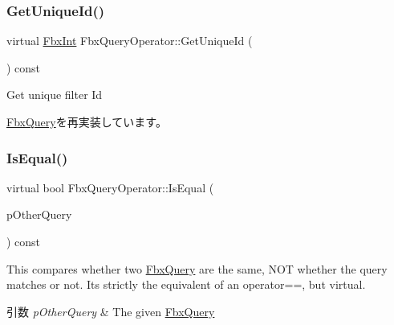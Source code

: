 \mbox{\label{class_fbx_query_operator_a55d021e0103b5e7dc0f8a80e4b468314}} 
\subsubsection{\texorpdfstring{Get\+Unique\+Id()}{GetUniqueId()}}
{\footnotesize\ttfamily virtual \hyperlink{fbxtypes_8h_a088fa96de3b0b3ea69f0f6afef525dfb}{Fbx\+Int} Fbx\+Query\+Operator\+::\+Get\+Unique\+Id (\begin{DoxyParamCaption}{ }\end{DoxyParamCaption}) const\hspace{0.3cm}{\ttfamily [virtual]}}



Get unique filter Id 



\hyperlink{class_fbx_query_ac7daae8f6fa83cd97ae24e93d7b4dc29}{Fbx\+Query}を再実装しています。

\mbox{\label{class_fbx_query_operator_aa96734a4da59286a2cab2832f0529175}} 
\subsubsection{\texorpdfstring{Is\+Equal()}{IsEqual()}}
{\footnotesize\ttfamily virtual bool Fbx\+Query\+Operator\+::\+Is\+Equal (\begin{DoxyParamCaption}\item[{\hyperlink{class_fbx_query}{Fbx\+Query} $\ast$}]{p\+Other\+Query }\end{DoxyParamCaption}) const\hspace{0.3cm}{\ttfamily [virtual]}}

This compares whether two \hyperlink{class_fbx_query}{Fbx\+Query} are the same, N\+OT whether the query matches or not. It\textquotesingle{}s strictly the equivalent of an operator==, but virtual. 
\begin{DoxyParams}{引数}
{\em p\+Other\+Query} & The given \hyperlink{class_fbx_query}{Fbx\+Query} \\
\hline
\end{DoxyParams}



